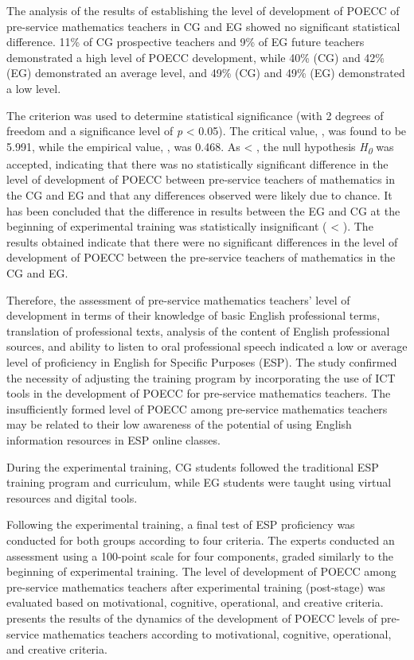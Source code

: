 The analysis of the results of establishing the level of development of
POECC of pre-service mathematics teachers in CG and EG showed no
significant statistical difference. 11\% of CG prospective teachers and
9\% of EG future teachers demonstrated a high level of POECC
development, while 40\% (CG) and 42\% (EG) demonstrated an average
level, and 49\% (CG) and 49\% (EG) demonstrated a low level.

The criterion was used to determine statistical significance (with 2
degrees of freedom and a significance level of \emph{p} \textless{}
0.05). The critical value, , was found to be 5.991, while the empirical
value, , was 0.468. As \textless{} , the null hypothesis
\emph{H}\textsubscript{\emph{0}} was accepted, indicating that there was
no statistically significant difference in the level of development of
POECC between pre-service teachers of mathematics in the CG and EG and
that any differences observed were likely due to chance. It has been
concluded that the difference in results between the EG and CG at the
beginning of experimental training was statistically insignificant (
\textless{} ). The results obtained indicate that there were no
significant differences in the level of development of POECC between the
pre-service teachers of mathematics in the CG and EG.

Therefore, the assessment of pre-service mathematics teachers' level of
development in terms of their knowledge of basic English professional
terms, translation of professional texts, analysis of the content of
English professional sources, and ability to listen to oral professional
speech indicated a low or average level of proficiency in English for
Specific Purposes (ESP). The study confirmed the necessity of adjusting
the training program by incorporating the use of ICT tools in the
development of POECC for pre-service mathematics teachers. The
insufficiently formed level of POECC among pre-service mathematics
teachers may be related to their low awareness of the potential of using
English information resources in ESP online classes.

During the experimental training, CG students followed the traditional
ESP training program and curriculum, while EG students were taught using
virtual resources and digital tools.

Following the experimental training, a final test of ESP proficiency was
conducted for both groups according to four criteria. The experts
conducted an assessment using a 100-point scale for four components,
graded similarly to the beginning of experimental training. The level of
development of POECC among pre-service mathematics teachers after
experimental training (post-stage) was evaluated based on motivational,
cognitive, operational, and creative criteria.  presents the
results of the dynamics of the development of POECC levels of
pre-service mathematics teachers according to motivational, cognitive,
operational, and creative criteria.

